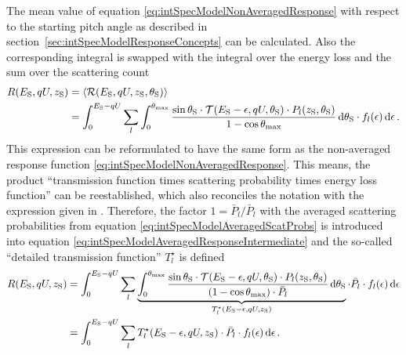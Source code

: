 The mean value of equation \eqref{eq:intSpecModelNonAveragedResponse} with respect to the starting pitch angle as described in section~\ref{sec:intSpecModelResponseConcepts} can be calculated. Also the corresponding integral is swapped with the integral over the energy loss and the sum over the scattering count
\begin{align}
	\label{eq:intSpecModelAveragedResponseIntermediate}
	R(E_\mathrm{S}, qU, z_\mathrm{S}) &= 
	\left\langle{\mathcal{R}(E_\mathrm{S}, qU, z_\mathrm{S}, \theta_\mathrm{S})}\right\rangle \nonumber\\ &=
	\int_{0}^{E_\mathrm{S}-qU}
	\sum_{l}
	\int_{0}^{\theta_\mathrm{max}}
	\frac{
		\sin\theta_\mathrm{S} \cdot
		\mathcal{T}(E_\mathrm{S}-\epsilon, qU, \theta_\mathrm{S}) \cdot P_l(z_\mathrm{S}, \theta_\mathrm{S})
	}{1-\cos\theta_\mathrm{max}}
	\mathop{}\!\mathrm{d} \theta_\mathrm{S}
	\cdot f_l(\epsilon)
	\mathop{}\!\mathrm{d} \epsilon
	\text{\,.}
\end{align}
This expression can be reformulated to have the same form as the non-averaged response function \eqref{eq:intSpecModelNonAveragedResponse}. This means, the product ``transmission function times scattering probability times energy loss function'' can be reestablished, which also reconciles the notation  with the expression given in \cite{Groh2015}. Therefore, the factor $1=\bar{P}_l/\bar{P}_l$ with the averaged scattering probabilities from equation \eqref{eq:intSpecModelAveragedScatProbs} is introduced into equation \eqref{eq:intSpecModelAveragedResponseIntermediate} and the so-called ``detailed transmission function'' $T_l^{\star}$ is defined
\begin{align}
	R(E_\mathrm{S}, qU, z_\mathrm{S}) &=
	\int_{0}^{E_\mathrm{S}-qU}
	\sum_{l}
	\underbrace{
		\int_{0}^{\theta_\mathrm{max}}
		\frac{
			\sin\theta_\mathrm{S} \cdot
			\mathcal{T}(E_\mathrm{S}-\epsilon, qU, \theta_\mathrm{S}) \cdot P_l(z_\mathrm{S}, \theta_\mathrm{S})
		}{
			(1-\cos\theta_\mathrm{max}) \cdot \bar{P}_l \vphantom{\large A}
		}
		\mathop{}\!\mathrm{d} \theta_\mathrm{S}
	}_{
		T_l^{\star}(E_\mathrm{S}-\epsilon,qU,z_\mathrm{S})
	}
	\cdot \bar{P}_l \cdot f_l(\epsilon)
	\mathop{}\!\mathrm{d} \epsilon \nonumber \\ &=
	\label{eq:intSpecModelFullResponseIntermediate}
	\int_{0}^{E_\mathrm{S}-qU}
	\sum_{l}
	T_l^{\star}(E_\mathrm{S}-\epsilon,qU,z_\mathrm{S})
	\cdot \bar{P}_l \cdot f_l(\epsilon)
	\mathop{}\!\mathrm{d} \epsilon
	\text{\,.}
\end{align}


